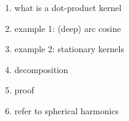 
\begin{enumerate}
\item what is a dot-product kernel
\item example 1: (deep) arc cosine
\item example 2: stationary kernels
\item decomposition
\item proof
\item refer to spherical harmonics
\end{enumerate}


